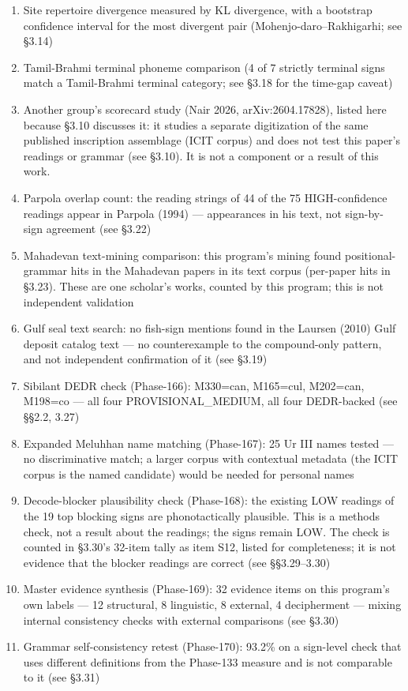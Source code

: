 \documentclass[
]{article}
\begin{document}
\begin{enumerate}
\item
  Site repertoire divergence measured by KL divergence, with a bootstrap confidence interval for the most divergent pair (Mohenjo-daro--Rakhigarhi; see §3.14)
\item
  Tamil-Brahmi terminal phoneme comparison (4 of 7 strictly terminal signs match a Tamil-Brahmi terminal category; see §3.18 for the time-gap caveat)
\item
  Another group's scorecard study (Nair 2026, arXiv:2604.17828), listed here because §3.10 discusses it: it studies a separate digitization of the same published inscription assemblage (ICIT corpus) and does not test this paper's readings or grammar (see §3.10). It is not a component or a result of this work.
\item
  Parpola overlap count: the reading strings of 44 of the 75 HIGH-confidence readings appear in Parpola (1994) --- appearances in his text, not sign-by-sign agreement (see §3.22)
\item
  Mahadevan text-mining comparison: this program's mining found positional-grammar hits in the Mahadevan papers in its text corpus (per-paper hits in §3.23). These are one scholar's works, counted by this program; this is not independent validation
\item
  Gulf seal text search: no fish-sign mentions found in the Laursen (2010) Gulf deposit catalog text --- no counterexample to the compound-only pattern, and not independent confirmation of it (see §3.19)
\item
  Sibilant DEDR check (Phase-166): M330=can, M165=cul, M202=can, M198=co --- all four PROVISIONAL\_MEDIUM, all four DEDR-backed (see §§2.2, 3.27)
\item
  Expanded Meluhhan name matching (Phase-167): 25 Ur III names tested
  --- no discriminative match; a larger corpus with contextual metadata
  (the ICIT corpus is the named candidate) would be needed for personal
  names
\item
  Decode-blocker plausibility check (Phase-168): the existing LOW readings of the 19 top blocking signs are phonotactically plausible. This is a methods check, not a result about the readings; the signs remain LOW. The check is counted in §3.30's 32-item tally as item S12, listed for completeness; it is not evidence that the blocker readings are correct (see §§3.29--3.30)
\item
  Master evidence synthesis (Phase-169): 32 evidence items on this program's own labels --- 12 structural, 8 linguistic, 8 external, 4 decipherment --- mixing internal consistency checks with external comparisons (see §3.30)
\item
  Grammar self-consistency retest (Phase-170): 93.2\% on a sign-level check that uses different definitions from the Phase-133 measure and is not comparable to it (see §3.31)
\end{enumerate}
\end{document}
